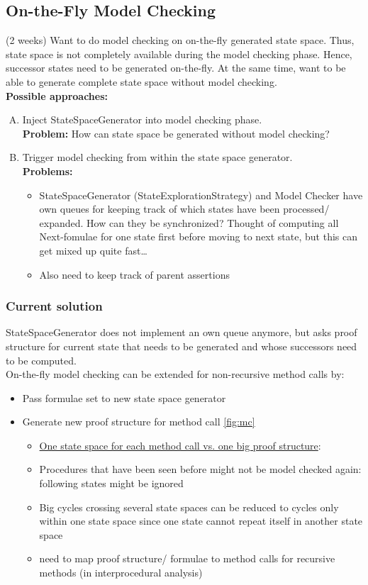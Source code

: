 \documentclass[a4paper,12pt]{article}
\begin{document}
\subsection{On-the-Fly Model Checking}							(2 weeks)
Want to do model checking on on-the-fly generated state space. Thus, state space is not completely available during the model checking phase. Hence, successor states need to be generated on-the-fly. At the same time, want to be able to generate complete state space without model checking.\\

\textbf{Possible approaches:}
\begin{enumerate}[(A)]
	\item Inject StateSpaceGenerator into model checking phase. \\
	\textbf{Problem:} How can state space be generated without model checking?
	\item	Trigger model checking from within the state space generator.\\
	\textbf{Problems:} 
	\begin{itemize}
		\item StateSpaceGenerator (StateExplorationStrategy) and Model Checker have own queues for keeping track of which states have been processed/ expanded. How can they be synchronized? Thought of computing all Next-fomulae for one state first before moving to next state, but this can get mixed up quite fast…
		\item Also need to keep track of parent assertions
	\end{itemize}
\end{enumerate}

\subsubsection{Current solution}
StateSpaceGenerator does not implement an own queue anymore, but asks proof structure for current state that needs to be generated and whose successors need to be computed.\\

On-the-fly model checking can be extended for non-recursive method calls by:

\begin{itemize}
	\item Pass formulae set to new state space generator
	\item Generate new proof structure for method call \ref{fig:mc} 
	\begin{itemize}
		\item \underline{One state space for each method call vs. one big proof structure}: 
		\item Procedures that have been seen before might not be model checked again: following states might be ignored
		\item Big cycles crossing several state spaces can be reduced to cycles only within one state space since one state cannot repeat itself in another state space
		\item need to map proof structure/ formulae to method calls for recursive methods (in interprocedural analysis)
	\end{itemize}
\end{itemize}
\end{document}
